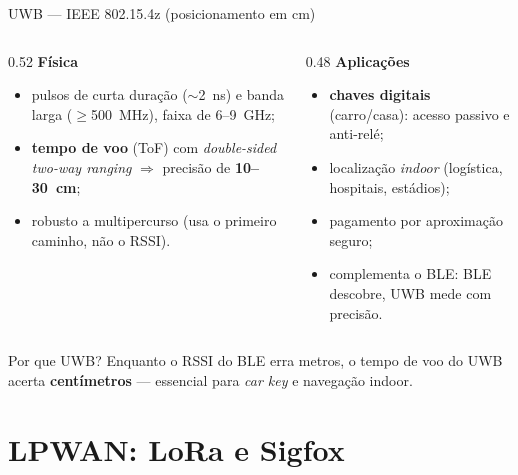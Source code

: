 \documentclass[aspectratio=169,11pt]{beamer}
\begin{document}
\begin{frame}{UWB --- IEEE 802.15.4z (posicionamento em cm)}
  \begin{columns}
    \begin{column}{0.52\textwidth}
      \textbf{Física}
      \begin{itemize}
        \item pulsos de curta duração ($\sim$2~ns) e banda larga ($\ge$500~MHz), faixa de 6--9~GHz;
        \item \textbf{tempo de voo} (ToF) com \emph{double-sided two-way ranging} $\Rightarrow$ precisão de \textbf{10--30~cm};
        \item robusto a multipercurso (usa o primeiro caminho, não o RSSI).
      \end{itemize}
    \end{column}
    \begin{column}{0.48\textwidth}
      \textbf{Aplicações}
      \begin{itemize}
        \item \textbf{chaves digitais} (carro/casa): acesso passivo e anti-relé;
        \item localização \emph{indoor} (logística, hospitais, estádios);
        \item pagamento por aproximação seguro;
        \item complementa o BLE: BLE descobre, UWB mede com precisão.
      \end{itemize}
    \end{column}
  \end{columns}
  \begin{alertblock}{Por que UWB?}
    Enquanto o RSSI do BLE erra metros, o tempo de voo do UWB acerta \textbf{centímetros} --- essencial para \emph{car key} e navegação indoor.
  \end{alertblock}
\end{frame}

\section{LPWAN: LoRa e Sigfox}
\end{document}
